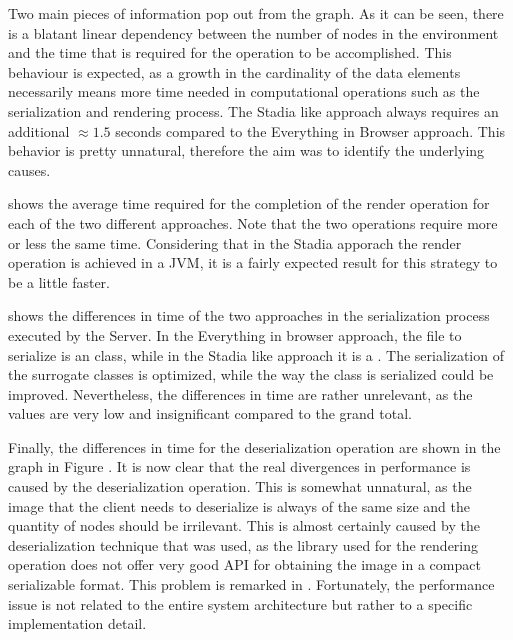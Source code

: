 Two main pieces of information pop out from the graph. As it can be seen, there is a blatant linear dependency between the number of nodes in the environment and the time that is required for the operation to be accomplished. This behaviour is expected, as a growth in the cardinality of the data elements necessarily means more time needed in computational operations such as the serialization and rendering process.
The Stadia like approach always requires an additional $\approx 1.5$ seconds compared to the Everything in Browser approach. This behavior is pretty unnatural, therefore the aim was to identify the underlying causes.\newline

 shows the average time required for the completion of the render operation for each of the two different approaches. Note that the two operations require more or less the same time. Considering that in the Stadia apporach the render operation is achieved in a JVM, it is a fairly expected result for this strategy to be a little faster.\newline


 shows the differences in time of the two approaches in the serialization process executed by the Server. In the Everything in browser approach, the file to serialize is an  class, while in the Stadia like approach it is a . The serialization of the surrogate classes is optimized, while the way the  class is serialized could be improved. Nevertheless, the differences in time are rather unrelevant, as the values are very low and insignificant compared to the grand total.\newline

Finally, the differences in time for the deserialization operation are shown in the graph in Figure . It is now clear that the real divergences in performance is caused by the deserialization operation. This is somewhat unnatural, as the image that the client needs to deserialize is always of the same size and the quantity of nodes should be irrilevant. This is almost certainly caused by the deserialization technique that was used, as the library used for the rendering operation does not offer very good API for obtaining the image in a compact serializable format. This problem is remarked in . Fortunately, the performance issue is not related to the entire system architecture but rather to a specific implementation detail.\newline

